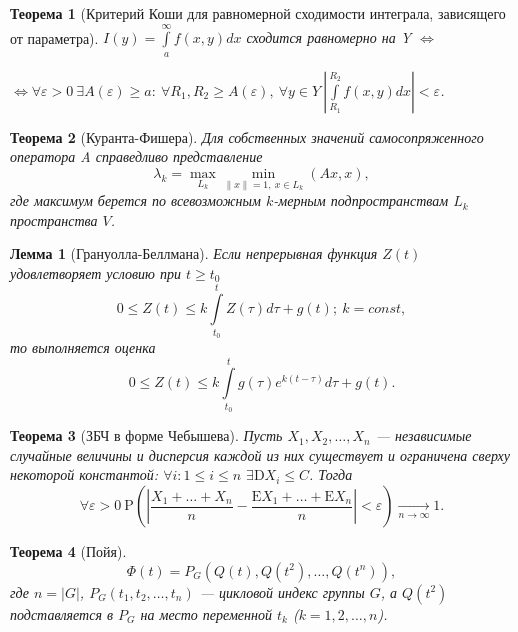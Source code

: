 \documentclass[a4paper]{article}
\theoremstyle{plain}
\newtheorem{sthm}{Теорема}
\newtheorem{slemm}{Лемма}
\newcommand{\D}{\mathrm{D}}
\newcommand{\E}{\mathrm{E}}
\renewcommand{\le}{\leqslant}
\renewcommand{\ge}{\geqslant}
\renewcommand{\epsilon}{\varepsilon}
\begin{document}
\begin{sthm}[Критерий Коши для равномерной сходимости интеграла, зависящего от параметра]

$I(y)=\int\limits_a^\infty f(x,y)dx $ сходится равномерно на Y $\Leftrightarrow$

$\Leftrightarrow \forall\epsilon>0\ \exists A(\epsilon)\ge a:\ \forall R_1, R_2\ge A(\epsilon),\ \forall y\in Y\ \left|\int\limits_{R_1}^{R_2} f(x,y)dx\right|<\epsilon$.
\end{sthm}
\bigskip
\begin{sthm}[Куранта-Фишера]

Для собственных значений самосопряженного оператора A справедливо представление
$$
\lambda_k=\max_{L_k} \min_{\|{x}\|=1,\ x \in L_k} (Ax,x),
$$
где максимум берется по всевозможным $k$-мерным подпространствам $L_k$ пространства $V$.
\end{sthm}
\bigskip
\begin{slemm}[Грануолла-Беллмана]

Если непрерывная функция $Z(t)$ удовлетворяет условию при $t \ge t_0$
$$
0 \le Z(t) \le k\int\limits_{t_0}^t Z(\tau)d\tau+g(t);\ k=const,
$$
то выполняется оценка
$$
0 \le Z(t) \le k \int\limits_{t_0}^t g(\tau)e^{k(t-\tau)}d\tau + g(t).
$$
\end{slemm}
\bigskip
\begin{sthm}[ЗБЧ в форме Чебышева]

Пусть $X_1, X_2,\ldots, X_n$ --- независимые случайные величины и дисперсия каждой из них существует и ограничена сверху некоторой константой: $\forall i: 1 \le i \le n$ $\exists \D X_i \le C$. Тогда
$$
\forall \epsilon >0 \ \mathrm{P}\left(\left|\dfrac{X_1+\ldots+X_n}{n}-\dfrac{\E X_1+\ldots+\E X_n}{n}\right|<\epsilon\right)\xrightarrow[n\to\infty]{}1.
$$
\end{sthm}
\bigskip
\begin{sthm}[Пойя]
$$
\Phi(t)=P_G(Q(t), Q(t^2),\ldots, Q(t^n)),
$$
где $n=|G|$, $P_G(t_1, t_2, \ldots, t_n)$ --- цикловой индекс группы $G$, а $Q(t^2)$ подставляется в $P_G$ на место переменной $t_k$ ($k=1, 2,\ldots, n$).
\end{sthm}
\end{document}
